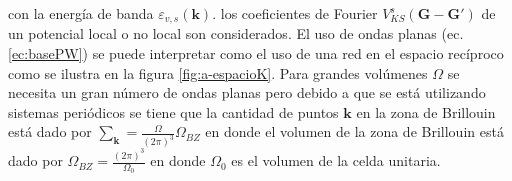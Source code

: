 \documentclass[12pt,a4paper, oneside]{book}
\begin{document}
   con la energ\'ia de banda $\varepsilon_{v,s} (\pmb{k})$. los coeficientes de Fourier $V_{KS} ^ s (\pmb{G}-\pmb{G'})$ de un potencial local o no local son considerados.
   \newline
   El uso de ondas planas (ec. \ref{ec:basePW}) se puede interpretar como el uso de una red en el espacio rec\'iproco como se ilustra en la figura \ref{fig:a-espacioK}. Para grandes vol\'umenes $\Omega$ se necesita un gran n\'umero de ondas planas pero debido  a que se est\'a utilizando sistemas peri\'odicos se tiene que la cantidad de puntos $\pmb{k}$ en la zona de Brillouin est\'a dado por $\sum_{\pmb{k}} = \frac{\Omega}{(2 \pi )^3} \Omega_{BZ}$  en donde el volumen de la zona de Brillouin est\'a dado por $\Omega_{BZ} =\frac{(2 \pi )^3}{\Omega_0} $ en donde $\Omega_0$ es el volumen de la celda unitaria.
   
\end{document}
